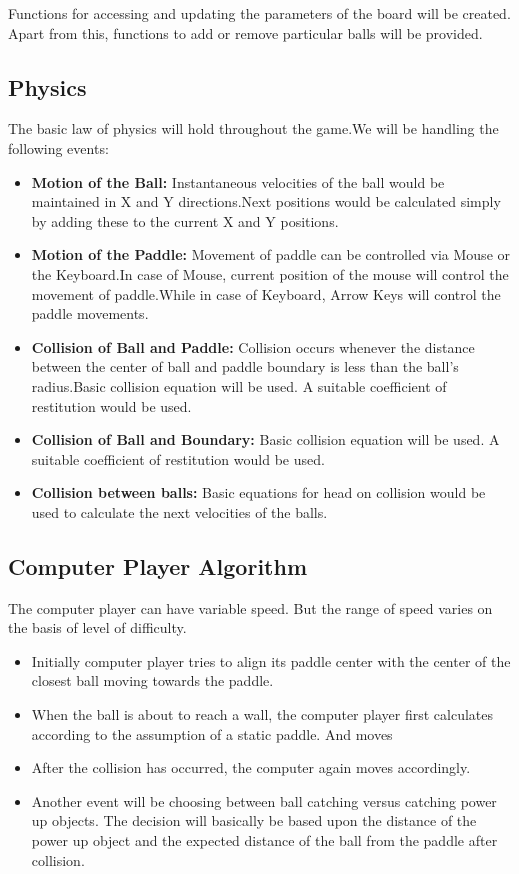 \documentclass{article}
\begin{document}
Functions for accessing and updating the parameters of the board will be created. Apart from this, functions to add or remove particular balls will be provided.

			\subsection{Physics}
			\par\noindent The basic law of physics will hold throughout the game.We will be handling the following events:
			\begin{itemize}
			\item \textbf{Motion of the Ball:} Instantaneous velocities of the ball would be maintained in X and Y directions.Next positions would be calculated simply by adding these to the current X and Y positions.
			\item \textbf{Motion of the Paddle:} Movement of paddle can be controlled via Mouse or the Keyboard.In case of Mouse, current position of the mouse will control the movement of paddle.While in case of Keyboard, Arrow Keys will control the paddle movements.
			\item \textbf{Collision of Ball and Paddle:} Collision occurs whenever the distance between the center of ball and paddle boundary is less than the ball's radius.Basic collision equation will be used. A suitable coefficient of restitution would be used.
			\item \textbf{Collision of Ball and Boundary:} Basic collision equation will be used. A suitable coefficient of restitution would be used.
			\item \textbf{Collision between balls:} Basic equations for head on collision would be used to calculate the next velocities of the balls.

			\end{itemize}
			

			\subsection{Computer Player Algorithm}
			\par\noindent The computer player can have variable speed. But the range of speed varies on the basis of level of difficulty.

			\begin{itemize}
			\item Initially computer player tries to align its paddle center with the center of the closest ball moving towards the paddle.
			\item When the ball is about to reach a wall, the computer player first calculates according to the assumption of a static paddle. And moves
			\item After the collision has occurred, the computer again moves accordingly.
			\item Another event will be choosing between ball catching versus catching power up objects. The decision will basically be based upon the distance of the power up object and the expected distance of the ball from the paddle after collision.
			\end{itemize}
\end{document}
